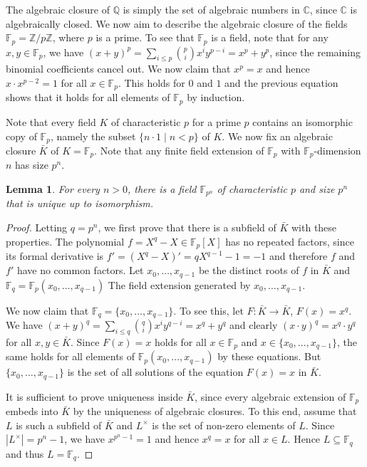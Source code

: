 \documentclass[10pt]{amsart}
\newcommand{\FF}{\mathbb{F}}
\newcommand{\ZZ}{\mathbb{Z}}
\newcommand{\QQ}{\mathbb{Q}}
\newcommand{\CCC}{\mathbb{C}}
\newtheorem{lemma}[theorem]{Lemma}
\theoremstyle{definition}
\theoremstyle{remark}
\begin{document}
The algebraic closure of $\QQ$ is simply the set of algebraic numbers in $\CCC$, since $\CCC$ is algebraically closed. We now aim to describe the algebraic closure of the fields $\FF_p=\ZZ/p\ZZ$, where $p$ is a prime. To see that $\FF_p$ is a field, note that for any $x,y\in \FF_p$, we have $(x+y)^p=\sum_{i\leq p}\binom{p}{i}x^i y^{p-i}=x^p+y^p$, since the remaining binomial coefficients cancel out. We now claim that  $x^p=x$ and hence $x\cdot x^{p-2}=1$ for all $x\in \FF_p$. This holds for $0$ and $1$ and the previous equation shows that it holds for all elements of $\FF_p$ by induction. 

Note that every field $K$ of characteristic $p$ for a prime $p$ contains an isomorphic copy of $\FF_p$, namely the subset $\{n\cdot 1\mid n<p\}$ of $K$. We now fix an algebraic closure $\bar{K}$ of $K=\FF_p$. Note that any finite field extension of $\FF_p$ with $\FF_p$-dimension $n$ has size $p^n$. 

\begin{lemma} 
For every $n>0$, there is a field $\FF_{p^n}$ of characteristic $p$ and size $p^n$ that is unique up to isomorphism. 
\end{lemma} 
\begin{proof} 
Letting $q=p^n$, we first prove that there is a subfield of $\bar{K}$ with these properties. The polynomial $f=X^q-X\in \FF_p[X]$ has no repeated factors, since its formal derivative is $f'=(X^q-X)'=qX^{q-1}-1=-1$ and therefore $f$ and $f'$ have no common factors. Let $x_0,\dots,x_{q-1}$ be the distinct roots of $f$ in $\bar{K}$ and $\FF_q=\FF_p(x_0,\dots,x_{q-1})$ The field extension generated by $x_0,\dots,x_{q-1}$. 

We now claim that $\FF_q=\{x_0,\dots,x_{q-1}\}$. To see this, let $F\colon \bar{K}\rightarrow \bar{K}$, $F(x)=x^q$. We have $(x+y)^q=\sum_{i\leq q}\binom{q}{i}x^i y^{q-i}=x^q+y^q$ and clearly $(x\cdot y)^q=x^q \cdot y^q$ for all $x,y\in \bar{K}$. Since $F(x)=x$ holds for all $x\in \FF_p$ and $x\in\{x_0,\dots,x_{q-1}\}$, the same holds for all elements of $\FF_p(x_0,\dots,x_{q-1})$ by these equations. But $\{x_0,\dots,x_{q-1}\}$ is the set of all solutions of the equation $F(x)=x$ in $\bar{K}$. 

It is sufficient to prove uniqueness inside $\bar{K}$, since every algebraic extension of $\FF_p$ embeds into $\bar{K}$ by the uniqueness of algebraic closures. To this end, assume that $L$ is such a subfield of $\bar{K}$ and $L^\times$ is the set of non-zero elements of $L$. Since $|L^\times|=p^n-1$, we have $x^{p^n-1}=1$ and hence $x^q=x$ for all $x\in L$. Hence $L\subseteq \FF_q$ and thus $L=\FF_q$. 
\end{proof} 
\end{document}

